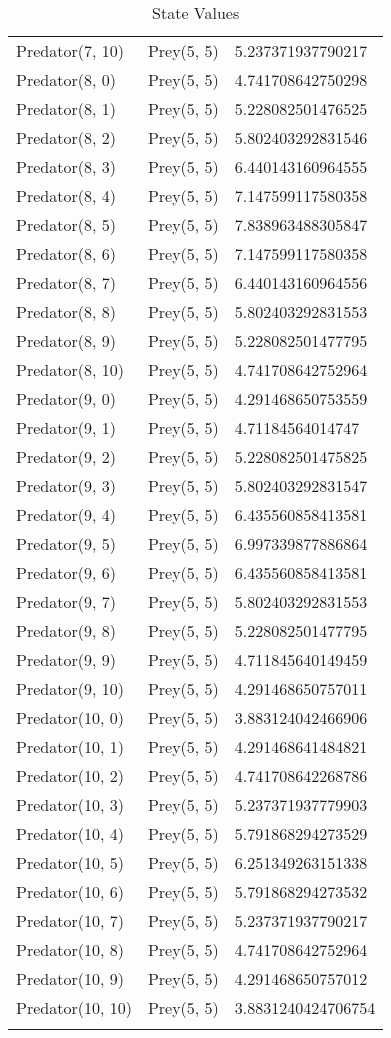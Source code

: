 \begin{longtable}{| p{} | p{} | p{} |}
Predator(7, 10) & Prey(5, 5) &5.237371937790217\\
Predator(8, 0) & Prey(5, 5) &4.741708642750298\\
Predator(8, 1) & Prey(5, 5) &5.228082501476525\\
Predator(8, 2) & Prey(5, 5) &5.802403292831546\\
Predator(8, 3) & Prey(5, 5) &6.440143160964555\\
Predator(8, 4) & Prey(5, 5) &7.147599117580358\\
Predator(8, 5) & Prey(5, 5) &7.838963488305847\\
Predator(8, 6) & Prey(5, 5) &7.147599117580358\\
Predator(8, 7) & Prey(5, 5) &6.440143160964556\\
Predator(8, 8) & Prey(5, 5) &5.802403292831553\\
Predator(8, 9) & Prey(5, 5) &5.228082501477795\\
Predator(8, 10) & Prey(5, 5) &4.741708642752964\\
Predator(9, 0) & Prey(5, 5) &4.291468650753559\\
Predator(9, 1) & Prey(5, 5) &4.71184564014747\\
Predator(9, 2) & Prey(5, 5) &5.228082501475825\\
Predator(9, 3) & Prey(5, 5) &5.802403292831547\\
Predator(9, 4) & Prey(5, 5) &6.435560858413581\\
Predator(9, 5) & Prey(5, 5) &6.997339877886864\\
Predator(9, 6) & Prey(5, 5) &6.435560858413581\\
Predator(9, 7) & Prey(5, 5) &5.802403292831553\\
Predator(9, 8) & Prey(5, 5) &5.228082501477795\\
Predator(9, 9) & Prey(5, 5) &4.711845640149459\\
Predator(9, 10) & Prey(5, 5) &4.291468650757011\\
Predator(10, 0) & Prey(5, 5) &3.883124042466906\\
Predator(10, 1) & Prey(5, 5) &4.291468641484821\\
Predator(10, 2) & Prey(5, 5) &4.741708642268786\\
Predator(10, 3) & Prey(5, 5) &5.237371937779903\\
Predator(10, 4) & Prey(5, 5) &5.791868294273529\\
Predator(10, 5) & Prey(5, 5) &6.251349263151338\\
Predator(10, 6) & Prey(5, 5) &5.791868294273532\\
Predator(10, 7) & Prey(5, 5) &5.237371937790217\\
Predator(10, 8) & Prey(5, 5) &4.741708642752964\\
Predator(10, 9) & Prey(5, 5) &4.291468650757012\\
Predator(10, 10) & Prey(5, 5) &3.8831240424706754\\
\caption{State Values} 
\label{tab:myfirstlongtable}
\end{longtable}

